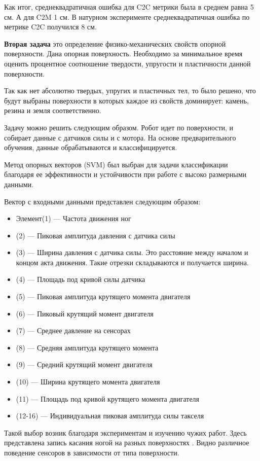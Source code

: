 Как итог, среднеквадратичная ошибка для C2C метрики была в среднем равна 5 см. А для C2M 1 см. В натурном эксперименте среднеквадратичная ошибка по метрике C2C получился 8 см.

\textbf{Вторая задача} это определение физико-механических свойств опорной поверхности. Дана опорная поверхность. Необходимо за минимальное время оценить процентное соотношение твердости, упругости и пластичности данной поверхности.

Так как нет абсолютно твердых, упругих и пластичных тел, то было решено, что будут выбраны поверхности в которых каждое из свойств доминирует: камень, резина и земля соответственно.

Задачу можно решить следующим образом. Робот идет по поверхности, и собирает данные с датчиков силы и с мотора. На основе предварительного обучения, данные обрабатываются и классифицируется.

Метод опорных векторов (SVM) был выбран  для задачи классификации благодаря ее эффективности и устойчивости при работе с высоко размерными данными.

Вектор с входными данными представлен следующим образом:
\begin{itemize}
    \item Элемент(1) --- Частота движения ног
    \item (2) --- Пиковая амплитуда давления с датчика силы
    \item (3) --- Ширина давления с датчика силы. Это расстояние между началом и концом акта движения. Такие отрезки складываются и получается ширина.
    \item (4) --- Площадь под кривой силы датчика
    \item (5) --- Пиковая амплитуда крутящего момента двигателя
    \item (6) --- Пиковый крутящий момент двигателя
    \item (7) --- Среднее давление на сенсорах
    \item (8) --- Средняя амплитуда крутящего момента
    \item (9) --- Средний крутящий момент двигателя
    \item (10) --- Ширина крутящего момента двигателя
    \item (11) --- Площадь под кривой крутящего момента двигателя
    \item (12-16) --- Индивидуальная пиковая амплитуда силы такселя 
\end{itemize}

Такой выбор возник благодаря экспериментам и изучению чужих работ. Здесь представлена запись касания ногой на разных поверхностях . Видно различное поведение сенсоров в зависимости от типа поверхности. 

